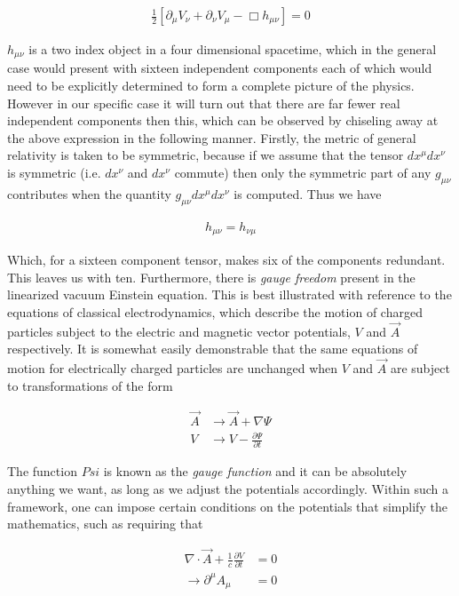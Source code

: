 \documentclass[paper=a4, fontsize=11pt]{scrartcl} %
\numberwithin{equation}{section} %
\numberwithin{figure}{section} %
\numberwithin{table}{section} %
\begin{document}
\begin{align}
\frac{1}{2}\left[\partial_{\mu}V_{\nu} + \partial_{\nu}V_{\mu} - \Box h_{\mu \nu}\right] = 0 
\end{align}

$h_{\mu \nu}$ is a two index object in a four dimensional spacetime, which in the general case would present with sixteen independent components each of which would need to be explicitly determined to form a complete picture of the physics. However in our specific case it will turn out that there are far fewer real independent components then this, which can be observed by chiseling away at the above expression in the following manner. Firstly, the metric of general relativity is taken to be symmetric, because if we assume that the tensor $dx^{\mu}dx^{\nu}$ is symmetric (i.e. $dx^{\nu}$ and $dx^{\nu}$ commute) then only the symmetric part of any $g_{\mu \nu}$ contributes when the quantity $g_{\mu \nu}dx^{\mu}dx^{\nu}$ is computed. Thus we have 

\begin{align}
h_{\mu \nu} = h_{\nu \mu}
\end{align}

Which, for a sixteen component tensor, makes six of the components redundant. This leaves us with ten. Furthermore, there is \textit{gauge freedom} present in the linearized vacuum Einstein equation. This is best illustrated with reference to the equations of classical electrodynamics, which describe the motion of charged particles subject to the electric and magnetic vector potentials, $V$ and $\vec{A}$ respectively. It is somewhat easily demonstrable that the same equations of motion for electrically charged particles are unchanged when $V$ and $\vec{A}$ are subject to transformations of the form 

\begin{align}
\vec{A} &\rightarrow \vec{A} + \nabla \Psi \\
V &\rightarrow V -\frac{\partial \Psi}{\partial t}
\end{align}  

The function $Psi$ is known as the \textit{gauge function} and it can be absolutely anything we want, as long as we adjust the potentials accordingly. Within such a framework, one can impose certain conditions on the potentials that simplify the mathematics, such as requiring that 

\begin{align}
\nabla \cdot \vec{A} + \frac{1}{c}\frac{\partial V}{\partial t} &= 0 \\
\rightarrow \partial^{\mu}A_{\mu} &= 0
\end{align}
\end{document}
